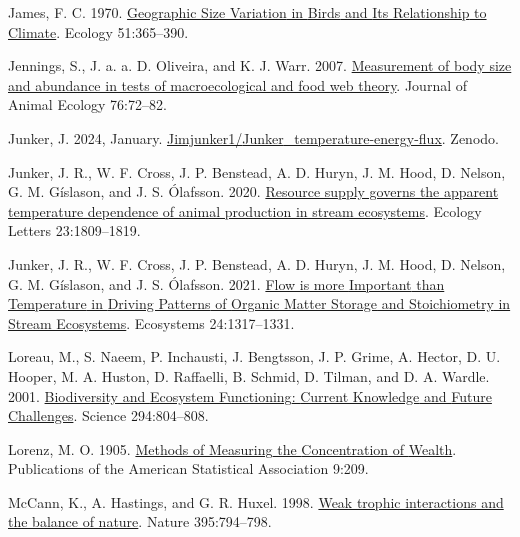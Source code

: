 \documentclass[
]{article}
\newlength{\cslhangindent}
\newlength{\cslentryspacingunit} %
\newenvironment{CSLReferences}[2] %
 {%
  \setlength{\parindent}{0pt}
  \ifodd #1
  \let\oldpar\par
  \def\par{\hangindent=\cslhangindent\oldpar}
  \fi
  \setlength{\parskip}{#2\cslentryspacingunit}
 }%
 {}
\numberwithin{equation}
\begin{document}
\begin{CSLReferences}{1}{0}
\leavevmode{}%
James, F. C. 1970. \href{https://doi.org/10.2307/1935374}{Geographic
{Size Variation} in {Birds} and {Its Relationship} to {Climate}}.
Ecology 51:365--390.

\leavevmode{}%
Jennings, S., J. a. a. D. Oliveira, and K. J. Warr. 2007.
\href{https://doi.org/10.1111/j.1365-2656.2006.01180.x}{Measurement of
body size and abundance in tests of macroecological and food web
theory}. Journal of Animal Ecology 76:72--82.

\leavevmode{}%
Junker, J. 2024, January.
\href{https://doi.org/10.5281/zenodo.10455905}{Jimjunker1/{Junker}\_temperature-energy-flux}.
Zenodo.

\leavevmode{}%
Junker, J. R., W. F. Cross, J. P. Benstead, A. D. Huryn, J. M. Hood, D.
Nelson, G. M. Gíslason, and J. S. Ólafsson. 2020.
\href{https://doi.org/10.1111/ele.13608}{Resource supply governs the
apparent temperature dependence of animal production in stream
ecosystems}. Ecology Letters 23:1809--1819.

\leavevmode{}%
Junker, J. R., W. F. Cross, J. P. Benstead, A. D. Huryn, J. M. Hood, D.
Nelson, G. M. Gíslason, and J. S. Ólafsson. 2021.
\href{https://doi.org/10.1007/s10021-020-00585-6}{Flow is more
{Important} than {Temperature} in {Driving Patterns} of {Organic Matter
Storage} and {Stoichiometry} in {Stream Ecosystems}}. Ecosystems
24:1317--1331.

\leavevmode{}%
Loreau, M., S. Naeem, P. Inchausti, J. Bengtsson, J. P. Grime, A.
Hector, D. U. Hooper, M. A. Huston, D. Raffaelli, B. Schmid, D. Tilman,
and D. A. Wardle. 2001.
\href{https://doi.org/10.1126/science.1064088}{Biodiversity and
{Ecosystem Functioning}: {Current Knowledge} and {Future Challenges}}.
Science 294:804--808.

\leavevmode{}%
Lorenz, M. O. 1905. \href{https://doi.org/10.2307/2276207}{Methods of
{Measuring} the {Concentration} of {Wealth}}. Publications of the
American Statistical Association 9:209.

\leavevmode{}%
McCann, K., A. Hastings, and G. R. Huxel. 1998.
\href{https://doi.org/10.1038/27427}{Weak trophic interactions and the
balance of nature}. Nature 395:794--798.


\end{CSLReferences}
\end{document}
